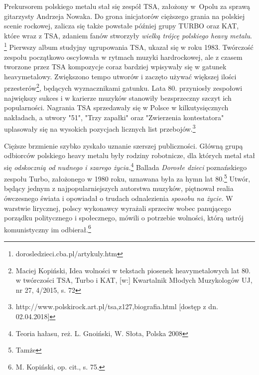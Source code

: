 \documentclass[12pt, a4paper, titlepage]{report}
\begin{document}
Prekursorem polskiego metalu stał się zespół TSA, założony w~Opolu za sprawą gitarzysty Andrzeja Nowaka. Do grona inicjatorów cięższego grania na polskiej scenie rockowej, zalicza się także powstałe później grupy TURBO oraz KAT, które wraz z TSA, zdaniem fanów stworzyły \textit{wielką trójcę polskiego heavy metalu}. \footnote{dorosledzieci.cba.pl/artykuly.htm} Pierwszy album studyjny ugrupowania TSA, ukazał się w roku 1983. Twórczość zespołu początkowo oscylowała w rytmach muzyki hardrockowej, ale z czasem tworzone przez TSA kompozycje coraz bardziej wpisywały się w gatunek heavymetalowy. Zwiększono tempo utworów i zaczęto używać większej ilości przesterów\footnote{Maciej Kopiński, Idea wolności w tekstach piosenek heavymetalowych lat 80. w twórczości TSA, Turbo i KAT, [w:] Kwartalnik Młodych Muzykologów UJ, nr 27, 4/2015, s. 72}, będących wyznacznikami gatunku. Lata 80. przyniosły zespołowi największy sukces i w karierze muzyków stanowiły bezsprzeczny szczyt ich popularności. Nagrania TSA sprzedawały się w Polsce w kilkutysięcznych nakładach, a utwory "51", "Trzy zapałki" oraz "Zwierzenia kontestatora" uplasowały się na wysokich pozycjach licznych list przebojów.\footnote{http://www.polskirock.art.pl/tsa,z127,biografia.html [dostęp z dn. 02.04.2018]} 

Cięższe brzmienie szybko zyskało uznanie szerszej publiczności. Główną grupą odbiorców polskiego heavy metalu były rodziny robotnicze, dla których metal stał się \textit{odskocznią od nudnego i szarego życia.}\footnote{Teoria hałasu, reż. L. Gnoiński, W. Słota, Polska 2008} Ballada \textit{Dorosłe dzieci} poznańskiego zespołu Turbo, założonego w 1980 roku, uznawana była za hymn lat 80.\footnote{Tamże} Utwór, będący jednym z najpopularniejszych autorstwa muzyków, piętnował realia ówczesnego świata i opowiadał o trudach odnalezienia \textit{sposobu na życie.} W warstwie lirycznej, polscy wykonawcy wyrażali sprzeciw wobec panującego porządku politycznego i społecznego, mówili o potrzebie wolności, którą ustrój komunistyczny im odbierał.\footnote{M. Kopiński, op. cit., s. 75.} 
\end{document}
